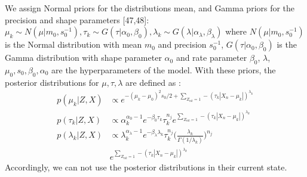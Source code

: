 \documentclass[conference]{IEEEtran}
\begin{document}
We assign Normal priors for the distributions mean, and Gamma
priors for the precision and shape parameters [47,48]:
$\mu_k \sim N(\mu| m_0, s_0^{-1}), \tau_k \sim G(\tau|\alpha_0, \beta_0), \lambda_k \sim G(\lambda|\alpha_{\lambda}, \beta_{\lambda})$ where $N(\mu| m_0, s_0^{-1})$
is the Normal distribution with mean $m_0$ and precision $s_0^{-1}$, $G(\tau|\alpha_0, \beta_0)$
is the Gamma distribution with shape parameter
$\alpha_0$ and rate parameter $\beta_0$, $\lambda$, $\mu_0, s_0, \beta_0, \alpha_0$ are the 
hyperparameters of the model.
With these priors, the posterior distributions for $\mu, \tau, \lambda$ are defined as \cite{b9}:
\begin{equation}
    \begin{split}
        p(\mu_k|Z, X) &\propto e ^{{-(\mu_k - \mu_0)^2 s_0/2} + \sum_{Z_{nk} = 1} - (\tau_k|X_n - \mu_k|)^{\lambda_k}}   \\
        p(\tau_k|Z, X) &\propto \alpha_k ^{\alpha_0 - 1} e ^{-\beta_0 \tau_k}\tau_k^{n_j} e ^{\sum_{Z_{nk} = 1} - (\tau_k|X_n - \mu_k|)^{\lambda_k}}   \\
        p(\lambda_k|Z, X) &\propto \lambda_k ^{\alpha_\lambda - 1} e ^{-\beta_\lambda \lambda_k}\tau_k^{n_j}\bigg(\frac{\lambda_k}{\Gamma(1/\lambda_k)}\bigg)^{n_j} \\
        &e ^{\sum_{Z_{nk} = 1} - (\tau_k|X_n - \mu_k|)^{\lambda_k}}  
    \end{split}
\end{equation}
Accordingly, we can not use the posterior distributions in their current state. 

    
\end{document}
